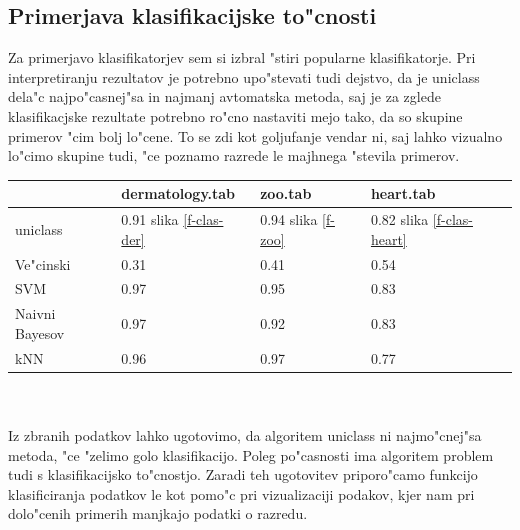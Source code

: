 \documentclass[a4paper]{article}
\begin{document}
	\subsection{Primerjava klasifikacijske to"cnosti}
		Za primerjavo klasifikatorjev sem si izbral "stiri popularne klasifikatorje. Pri interpretiranju rezultatov je potrebno upo"stevati tudi dejstvo, da je uniclass dela"c najpo"casnej"sa in najmanj avtomatska metoda, saj je za zglede klasifikacjske rezultate potrebno ro"cno nastaviti mejo tako, da so skupine primerov "cim bolj lo"cene. To se zdi kot goljufanje vendar ni, saj lahko vizualno lo"cimo skupine tudi, "ce poznamo razrede le majhnega "stevila primerov.\\

		\begin{tabular}{ | l | l | l | l | }
		\hline
		 & dermatology.tab & zoo.tab & heart.tab \\ \hline
		uniclass & 0.91 slika \ref{f-clas-der} & 0.94 slika \ref{f-zoo} & 0.82 slika \ref{f-clas-heart} \\ \hline
		Ve"cinski & 0.31 & 0.41 & 0.54 \\ \hline
		SVM & 0.97 & 0.95 & 0.83 \\ \hline
		Naivni Bayesov & 0.97 & 0.92 & 0.83 \\ \hline
		kNN & 0.96 & 0.97 & 0.77 \\ \hline
		\end{tabular}
		\\\\
		Iz zbranih podatkov lahko ugotovimo, da algoritem uniclass ni najmo"cnej"sa metoda, "ce "zelimo golo klasifikacijo. Poleg po"casnosti ima algoritem problem tudi s klasifikacijsko to"cnostjo. Zaradi teh ugotovitev priporo"camo funkcijo klasificiranja podatkov le kot pomo"c pri vizualizaciji podakov, kjer nam pri dolo"cenih primerih manjkajo podatki o razredu. 
		
\end{document}
